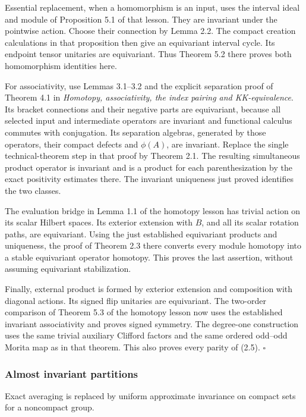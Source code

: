 \documentclass[
  11pt,
]{article}
\begin{document}
Essential replacement, when a homomorphism is an input, uses the
interval ideal and module of Proposition 5.1 of that lesson. They are
invariant under the pointwise action. Choose their connection by Lemma
2.2. The compact creation calculations in that proposition then give an
equivariant interval cycle. Its endpoint tensor unitaries are
equivariant. Thus Theorem 5.2 there proves both homomorphism identities
here.

For associativity, use Lemmas 3.1--3.2 and the explicit separation proof
of Theorem 4.1 in \emph{Homotopy, associativity, the index pairing and
KK-equivalence}. Its bracket connections and their negative parts are
equivariant, because all selected input and intermediate operators are
invariant and functional calculus commutes with conjugation. Its
separation algebras, generated by those operators, their compact defects
and \(\phi(A)\), are invariant. Replace the single technical-theorem
step in that proof by Theorem 2.1. The resulting simultaneous product
operator is invariant and is a product for each parenthesization by the
exact positivity estimates there. The invariant uniqueness just proved
identifies the two classes.

The evaluation bridge in Lemma 1.1 of the homotopy lesson has trivial
action on its scalar Hilbert spaces. Its exterior extension with \(B\),
and all its scalar rotation paths, are equivariant. Using the just
established equivariant products and uniqueness, the proof of Theorem
2.3 there converts every module homotopy into a stable equivariant
operator homotopy. This proves the last assertion, without assuming
equivariant stabilization.

Finally, external product is formed by exterior extension and
composition with diagonal actions. Its signed flip unitaries are
equivariant. The two-order comparison of Theorem 5.3 of the homotopy
lesson now uses the established invariant associativity and proves
signed symmetry. The degree-one construction uses the same trivial
auxiliary Clifford factors and the same ordered odd--odd Morita map as
in that theorem. This also proves every parity of (2.5). \(\square\)

\subsubsection{Almost invariant
partitions}\label{almost-invariant-partitions}

Exact averaging is replaced by uniform approximate invariance on compact
sets for a noncompact group.
\end{document}

